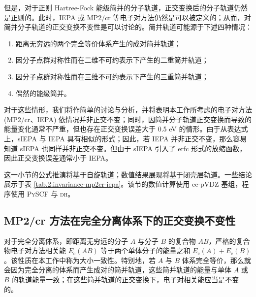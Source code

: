 但是，对于正则 Hartree-Fock 能级简并的分子轨道，正交变换后的分子轨道仍然是正则的。此时，IEPA 或 MP2/cr 等电子对方法仍然是可以被定义的；从而，对简并分子轨道的正交变换不变性是可以讨论的。简并轨道可能源于下述四种情况：
\begin{enumerate}[nosep]
  \item 距离无穷远的两个完全等价体系产生的成对简并轨道；
  \item 因分子点群对称性而在二维不可约表示下产生的二重简并轨道；
  \item 因分子点群对称性而在三维不可约表示下产生的三重简并轨道；
  \item 偶然的能级简并。
\end{enumerate}
对于这些情形，我们将作简单的讨论与分析，并将表明本工作所考虑的电子对方法 (MP2/cr、IEPA) 依情况并非正交不变；同时，因简并分子轨道正交变换而导致的能量变化通常不严重，但也存在正交变换误差大于 0.5 eV 的情形。由于从表达式上，sIEPA 与 IEPA 具有相似的形式；因此，若 IEPA 并非正交不变，那么容易知道 sIEPA 也同样并非正交不变。但由于 sIEPA 引入了 erfc 形式的放缩函数，因此正交变换误差通常小于 IEPA。

这一小节的公式推演将基于自旋轨道；数值结果展现将基于闭壳层轨道。一些结论展示于表 \ref{tab.2.invariance-mp2cr-iepa}。该节的数值计算使用 cc-pVDZ 基组，程序使用 \textsc{PySCF} 与 \textsc{dh}。

\begin{table}[!ht]
\centering
\caption[MP2/cr 与 IEPA 在不同情形下的正交变换不变性]{MP2/cr 与 IEPA 在不同情形下能级简并轨道间的正交变换不变性。}
\label{tab.2.invariance-mp2cr-iepa}
\end{table}

\subsection{MP2/cr 方法在完全分离体系下的正交变换不变性}

对于完全分离体系，即距离无穷远的分子 $A$ 与分子 $B$ 的复合物 $AB$，严格的复合物电子对方法相关能 $E_\mathrm{c} (AB)$ 等于两个单体分子的能量之和 $E_\mathrm{c} (A) + E_\mathrm{c} (B)$。该性质在本工作中称为大小一致性。特别地，若 $A$ 与 $B$ 体系完全等价，那么就会因为完全分离的体系而产生成对的简并轨道，这些简并轨道的能量与单体 $A$ 或 $B$ 的轨道能量一致；在这些简并轨道的正交变换下，电子对相关能应当是不变的。

